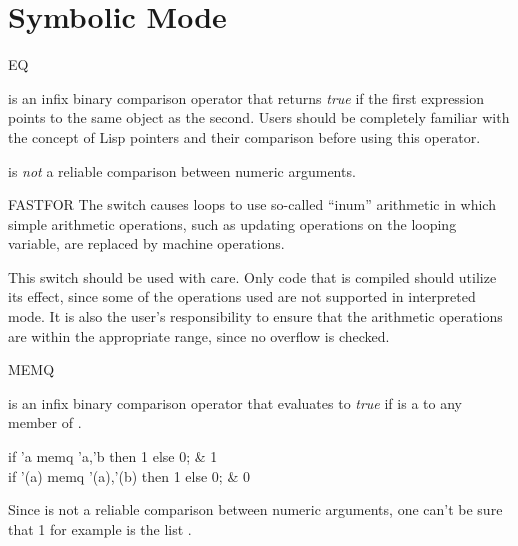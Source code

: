 \section{Symbolic Mode}

\begin{Operator}{EQ}
\begin{Syntax}
  
\end{Syntax}

 is an infix binary comparison operator that returns {\em true\/}
if the first expression points to the same object as the second.  Users
should be completely familiar with the concept of Lisp pointers and their
comparison before using this operator.

\begin{Comments}
 is {\em not\/}
a reliable comparison between numeric arguments.
\end{Comments}

\end{Operator}

\begin{Switch}{FASTFOR}
The switch  causes  loops to use so-called
``inum'' arithmetic in which simple arithmetic operations, such as
updating operations on the looping variable, are replaced by machine
operations.

\begin{Comments}
This switch should be used with care.  Only code that is compiled should
utilize its effect, since some of the operations used are not supported
in interpreted mode.  It is also the user's responsibility to ensure that
the arithmetic operations are within the appropriate range, since no
overflow is checked.
\end{Comments}

\end{Switch}


\begin{Operator}{MEMQ}

\begin{Syntax}
  
\end{Syntax}

 is an infix binary comparison operator that evaluates to
{\em true\/} if  is a  to any member of
.

\begin{Examples}
if 'a memq {'a,'b} then 1 else 0; & 1 \\
if '(a) memq {'(a),'(b)} then 1 else 0; & 0
\end{Examples}

\begin{Comments}
Since  is not a reliable comparison between numeric arguments,
one can't be sure that 1 for example is  the list
.
\end{Comments}


\end{Operator}


